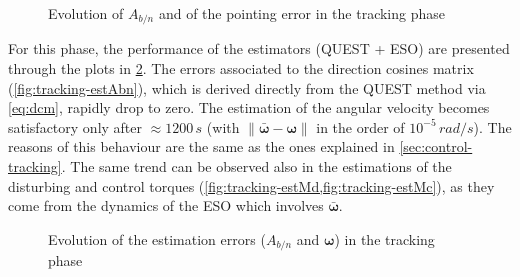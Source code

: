 \begin{figure}[h!]
    \centering
    \caption{Evolution of $A_{b/n}$ and of the pointing error in the tracking phase}
    \label{fig:tracking-Abn_pe}
\end{figure}

For this phase, the performance of the estimators (QUEST + ESO) are presented through the plots in \cref{fig:tracking-estWabn}. The errors associated to the direction cosines matrix (\cref{fig:tracking-estAbn}), which is derived directly from the QUEST method via \cref{eq:dcm}, rapidly drop to zero. The estimation of the angular velocity becomes satisfactory only after $\approx 1200 \, s$ (with $\| \bar{\bm{\omega}} - \bm{\omega} \|$ in the order of $10^{-5} \, rad/s$). The reasons of this behaviour are the same as the ones explained in \cref{sec:control-tracking}. The same trend can be observed also in the estimations of the disturbing and control torques (\cref{fig:tracking-estMd,fig:tracking-estMc}), as they come from the dynamics of the ESO which involves $\bar{\bm{\omega}}$. 

\begin{figure}[h!]
    \centering
    \caption{Evolution of the estimation errors ($A_{b/n}$ and $\bm{\omega}$) in the tracking phase}
    \label{fig:tracking-estWabn}
\end{figure}   

